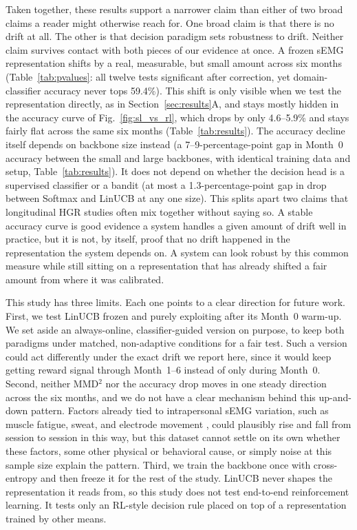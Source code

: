\documentclass[journal]{IEEEtran}
\begin{document}
Taken together, these results support a narrower claim than either of two broad claims a reader might otherwise reach for. One broad claim is that there is no drift at all. The other is that decision paradigm sets robustness to drift. Neither claim survives contact with both pieces of our evidence at once. A frozen sEMG representation shifts by a real, measurable, but small amount across six months (Table~\ref{tab:pvalues}: all twelve tests significant after correction, yet domain-classifier accuracy never tops 59.4\%). This shift is only visible when we test the representation directly, as in Section~\ref{sec:results}A, and stays mostly hidden in the accuracy curve of Fig.~\ref{fig:sl_vs_rl}, which drops by only 4.6--5.9\% and stays fairly flat across the same six months (Table~\ref{tab:results}). The accuracy decline itself depends on backbone size instead (a 7--9-percentage-point gap in Month~0 accuracy between the small and large backbones, with identical training data and setup, Table~\ref{tab:results}). It does not depend on whether the decision head is a supervised classifier or a bandit (at most a 1.3-percentage-point gap in drop between Softmax and LinUCB at any one size). This splits apart two claims that longitudinal HGR studies often mix together without saying so. A stable accuracy curve is good evidence a system handles a given amount of drift well in practice, but it is not, by itself, proof that no drift happened in the representation the system depends on. A system can look robust by this common measure while still sitting on a representation that has already shifted a fair amount from where it was calibrated.

This study has three limits. Each one points to a clear direction for future work. First, we test LinUCB frozen and purely exploiting after its Month~0 warm-up. We set aside an always-online, classifier-guided version \cite{LinPaskettYang2025} on purpose, to keep both paradigms under matched, non-adaptive conditions for a fair test. Such a version could act differently under the exact drift we report here, since it would keep getting reward signal through Month~1--6 instead of only during Month~0. Second, neither MMD$^2$ nor the accuracy drop moves in one steady direction across the six months, and we do not have a clear mechanism behind this up-and-down pattern. Factors already tied to intrapersonal sEMG variation, such as muscle fatigue, sweat, and electrode movement \cite{Unanyan2021,He2015}, could plausibly rise and fall from session to session in this way, but this dataset cannot settle on its own whether these factors, some other physical or behavioral cause, or simply noise at this sample size explain the pattern. Third, we train the backbone once with cross-entropy and then freeze it for the rest of the study. LinUCB never shapes the representation it reads from, so this study does not test end-to-end reinforcement learning. It tests only an RL-style decision rule placed on top of a representation trained by other means.
\end{document}

